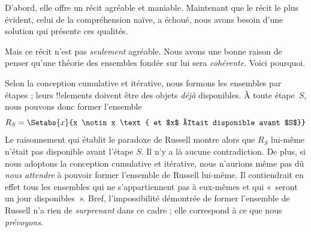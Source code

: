\documentclass[../../../include/open-logic-section]{subfiles}
\begin{document}
D'abord, elle offre un récit agréable et maniable. Maintenant que le
récit le plus évident, celui de la compréhension naïve, a échoué, nous
avons besoin d'une solution qui présente ces qualités.

Mais ce récit n'est pas \emph{seulement} agréable. Nous avons une bonne
raison de penser qu'une théorie des ensembles fondée sur lui sera
\emph{cohérente}. Voici pourquoi.

Selon la conception cumulative et itérative, nous formons les
ensembles par étapes ; leurs !!{element}s doivent être des objets
\emph{déjà} disponibles. À toute étape~$S$, nous pouvons donc former
l'ensemble
\[
	R_S = \Setabs{x}{x \notin x \text{ et $x$ était disponible avant $S$}}
\]
Le raisonnement qui établit le paradoxe de Russell montre alors que
$R_S$ lui-même n'était pas disponible avant l'étape $S$. Il n'y a là
aucune contradiction. De plus, si nous adoptons la conception
cumulative et itérative, nous n'aurions même pas dû \emph{nous
attendre} à pouvoir former l'ensemble de Russell lui-même. Il
contiendrait en effet tous les ensembles qui ne s'appartiennent pas à
eux-mêmes et qui «~seront un jour disponibles~». Bref, l'impossibilité
démontrée de former l'ensemble de Russell n'a rien de \emph{surprenant}
dans ce cadre ; elle correspond à ce que nous \emph{prévoyons}.

%
%
\end{document}

